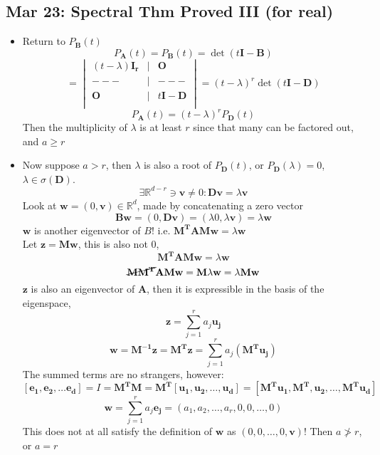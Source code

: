 \documentclass[10pt, oneside]{article}
\let\geq\geqslant
\newcommand{\R}{\mathbb{R}}
\renewcommand{\vec}[1]{\mathbf{#1}}
\newcommand{\mat}[1]{\mathbf{#1}}
\begin{document}
\subsection{Mar 23: Spectral Thm Proved III (for real)}
\begin{itemize}
    \item Return to $P_\mat{B}(t)$
            \[P_\mat{A}(t) = P_\mat{B}(t) = \det(t\mat{I} - \mat{B})\]
            \[= \begin{vmatrix}
                (t  -\lambda) \mat{I_r} & | & \mat{O} \\
                --- & | & --- \\
                \mat{O} & | & t\mat{I} -  \mat{D} \\
            \end{vmatrix}
            = (t-\lambda)^r \det(t\mat{I} - \mat{D})\]
            \[P_\mat{A}(t) = (t-\lambda)^r P_\mat{D}(t)\]
        Then the multiplicity of $\lambda$ is at least $r$ since that many can be factored out, and $a \geq r$
    \item Now suppose $a > r$, then $\lambda$ is also a root of $P_\mat{D}(t)$, or $P_\mat{D}(\lambda) = 0$, $\lambda \in \sigma(\mat{D})$.
            \[\exists \R^{d-r} \ni \vec{v} \neq 0 : \mat{D} \vec{v} = \lambda \vec{v}\]
        Look at $\vec{w} = (0,\vec{v}) \in \R^d$, made by concatenating a zero vector
            \[\mat{B}\vec{w} = (0,\mat{D}\vec{v}) = (\lambda 0, \lambda \vec{v}) = \lambda \vec{w}\]
        $\vec{w}$ is another eigenvector of $B$! i.e. $\mat{M^T}\mat{A}\mat{M}\vec{w} = \lambda \vec{w}$\\
        Let $\vec{z} = \mat{M}\vec{w}$, this is also not $0$,
            \[\mat{M^T}\mat{A}\mat{M}\vec{w} = \lambda \vec{w}\]
            \[\cancel{\mat{M}\mat{M^T}}\mat{A}\mat{M}\vec{w} = \mat{M}\lambda\vec{w} = \lambda \mat{M}\vec{w}\]
        $\vec{z}$ is also an eigenvector of $\mat{A}$, then it is expressible in the basis of the eigenspace,\\
            \[\vec{z} = \sum_{j=1}^r a_j \vec{u_j}\]
            \[\vec{w} = \mat{M^{-1}}\vec{z} = \mat{M^T}\vec{z} = \sum_{j=1}^r a_j (\mat{M^T}\vec{u_j})\]
                The summed terms are no strangers, however:
            \[[\vec{e_1}, \vec{e_2},\hdots \vec{e_d}] = I = \mat{M^T}\mat{M} = \mat{M^T}[\vec{u_1},\vec{u_2}, \hdots, \vec{u_d}] = [\mat{M^T}\vec{u_1},\mat{M^T},\vec{u_2}, \hdots, \mat{M^T}\vec{u_d}]\]
            \[\vec{w} = \sum_{j=1}^r a_j \vec{e_j} = (a_1, a_2, \hdots, a_r, 0, 0, \hdots, 0)\]
        This does not at all satisfy the definition of $\vec{w}$ as $(0,0,\hdots,0,\vec{v})$! Then $a \ngtr r$, or $a = r$
\end{itemize}
\end{document}
